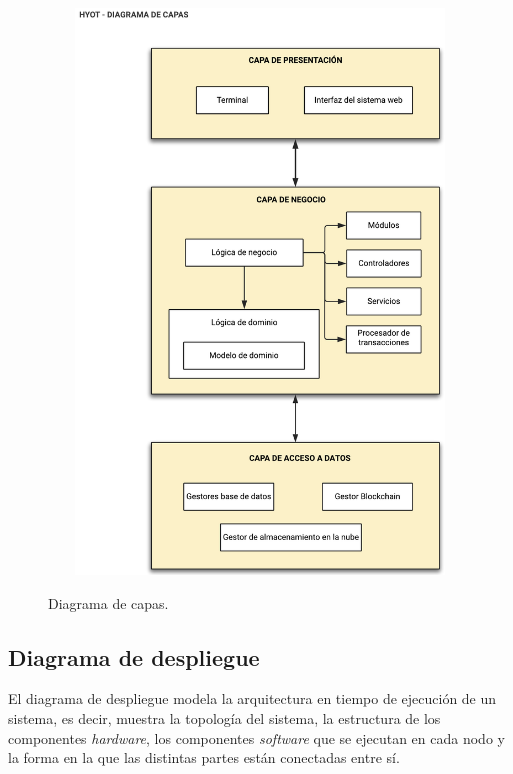 \documentclass[12pt,a4paper, twoside]{report}
\begin{document}
	\begin{figure}[!ht]   
		\caption{Diagrama de capas.} 
		\begin{center} 
			\includegraphics[width=12cm,height=15cm]{Images/design/d_layers} \\
			\label{fig:design_layers} 
		\end{center}  
	\end{figure}	
	
	\subsection{Diagrama de despliegue} \label{d_deployment}
	
	El diagrama de despliegue modela la arquitectura en tiempo de ejecución de un sistema, es decir, muestra la topología del sistema, la estructura de los componentes \textit{hardware}, los componentes \textit{software} que se ejecutan en cada nodo y la forma en la que las distintas partes están conectadas entre sí. \\
 		
\end{document}
